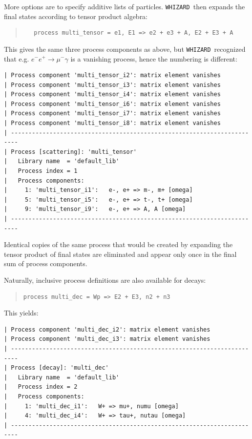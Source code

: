 \documentclass[12pt]{book}
\newcommand{\ttt}[1]{\texttt{#1}}
\newcommand{\whizard}{\ttt{WHIZARD}}
\begin{document}
More options are to specify additive lists of particles. \whizard\
then expands the final states according to tensor product algebra:
\begin{quote}
\begin{footnotesize}
\begin{verbatim}
   process multi_tensor = e1, E1 => e2 + e3 + A, E2 + E3 + A
\end{verbatim}
\end{footnotesize}
\end{quote}
This gives the same three process components as above, but \whizard\
recognized that e.g. $e^- e^+ \to \mu^- \gamma$ is a vanishing
process, hence the numbering is different:
\begin{footnotesize}
\begin{Verbatim}
| Process component 'multi_tensor_i2': matrix element vanishes
| Process component 'multi_tensor_i3': matrix element vanishes
| Process component 'multi_tensor_i4': matrix element vanishes
| Process component 'multi_tensor_i6': matrix element vanishes
| Process component 'multi_tensor_i7': matrix element vanishes
| Process component 'multi_tensor_i8': matrix element vanishes
| ------------------------------------------------------------------------
| Process [scattering]: 'multi_tensor'
|   Library name  = 'default_lib'
|   Process index = 1
|   Process components:
|     1: 'multi_tensor_i1':   e-, e+ => m-, m+ [omega]
|     5: 'multi_tensor_i5':   e-, e+ => t-, t+ [omega]
|     9: 'multi_tensor_i9':   e-, e+ => A, A [omega]
| ------------------------------------------------------------------------
\end{Verbatim}
\end{footnotesize}
Identical copies of the same process that would be created by
expanding the tensor product of final states are eliminated and appear
only once in the final sum of process components.

Naturally, inclusive process definitions are also available for
decays:
\begin{quote}
\begin{footnotesize}
\begin{Verbatim}
process multi_dec = Wp => E2 + E3, n2 + n3
\end{Verbatim}
\end{footnotesize}
\end{quote}
This yields:
\begin{footnotesize}
\begin{Verbatim}
| Process component 'multi_dec_i2': matrix element vanishes
| Process component 'multi_dec_i3': matrix element vanishes
| ------------------------------------------------------------------------
| Process [decay]: 'multi_dec'
|   Library name  = 'default_lib'
|   Process index = 2
|   Process components:
|     1: 'multi_dec_i1':   W+ => mu+, numu [omega]
|     4: 'multi_dec_i4':   W+ => tau+, nutau [omega]
| ------------------------------------------------------------------------
\end{Verbatim}
\end{footnotesize}
\end{document}
